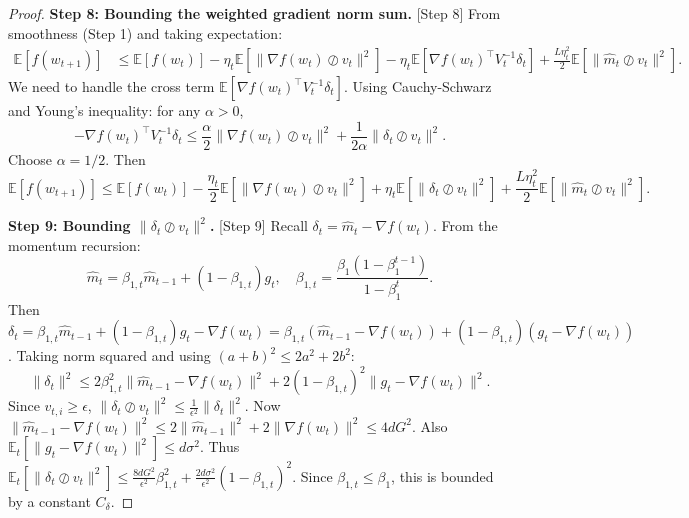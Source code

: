 \documentclass{article}
\begin{document}
\begin{proof}
\textbf{Step 8: Bounding the weighted gradient norm sum.} [Step 8]
From smoothness (Step 1) and taking expectation:
\begin{align}
    \mathbb{E}[f(w_{t+1})] &\le \mathbb{E}[f(w_t)] - \eta_t \mathbb{E}[\|\nabla f(w_t) \oslash v_t\|^2] - \eta_t \mathbb{E}[\nabla f(w_t)^\top V_t^{-1} \delta_t] + \frac{L \eta_t^2}{2} \mathbb{E}[\|\hat{m}_t \oslash v_t\|^2]. \tag{8}
\end{align}
We need to handle the cross term $\mathbb{E}[\nabla f(w_t)^\top V_t^{-1} \delta_t]$. Using Cauchy-Schwarz and Young's inequality: for any $\alpha > 0$,
\begin{equation}
    - \nabla f(w_t)^\top V_t^{-1} \delta_t \le \frac{\alpha}{2} \|\nabla f(w_t) \oslash v_t\|^2 + \frac{1}{2\alpha} \|\delta_t \oslash v_t\|^2. \tag{9}
\end{equation}
Choose $\alpha = 1/2$. Then
\begin{equation}
    \mathbb{E}[f(w_{t+1})] \le \mathbb{E}[f(w_t)] - \frac{\eta_t}{2} \mathbb{E}[\|\nabla f(w_t) \oslash v_t\|^2] + \eta_t \mathbb{E}[\|\delta_t \oslash v_t\|^2] + \frac{L \eta_t^2}{2} \mathbb{E}[\|\hat{m}_t \oslash v_t\|^2]. \tag{10}
\end{equation}

\textbf{Step 9: Bounding $\|\delta_t \oslash v_t\|^2$.} [Step 9]
Recall $\delta_t = \hat{m}_t - \nabla f(w_t)$. From the momentum recursion:
\begin{equation}
    \hat{m}_t = \beta_{1,t} \hat{m}_{t-1} + (1-\beta_{1,t}) g_t, \quad \beta_{1,t} = \frac{\beta_1(1-\beta_1^{t-1})}{1-\beta_1^t}.
\end{equation}
Then $\delta_t = \beta_{1,t} \hat{m}_{t-1} + (1-\beta_{1,t}) g_t - \nabla f(w_t) = \beta_{1,t} (\hat{m}_{t-1} - \nabla f(w_t)) + (1-\beta_{1,t})(g_t - \nabla f(w_t))$.
Taking norm squared and using $(a+b)^2 \le 2a^2 + 2b^2$:
\begin{equation}
    \|\delta_t\|^2 \le 2\beta_{1,t}^2 \|\hat{m}_{t-1} - \nabla f(w_t)\|^2 + 2(1-\beta_{1,t})^2 \|g_t - \nabla f(w_t)\|^2.
\end{equation}
Since $v_{t,i} \ge \epsilon$, $\|\delta_t \oslash v_t\|^2 \le \frac{1}{\epsilon^2} \|\delta_t\|^2$.
Now $\|\hat{m}_{t-1} - \nabla f(w_t)\|^2 \le 2\|\hat{m}_{t-1}\|^2 + 2\|\nabla f(w_t)\|^2 \le 4d G^2$.
Also $\mathbb{E}_t[\|g_t - \nabla f(w_t)\|^2] \le d \sigma^2$.
Thus $\mathbb{E}_t[\|\delta_t \oslash v_t\|^2] \le \frac{8d G^2}{\epsilon^2} \beta_{1,t}^2 + \frac{2d \sigma^2}{\epsilon^2} (1-\beta_{1,t})^2$.
Since $\beta_{1,t} \le \beta_1$, this is bounded by a constant $C_\delta$.


\end{proof}
\end{document}
